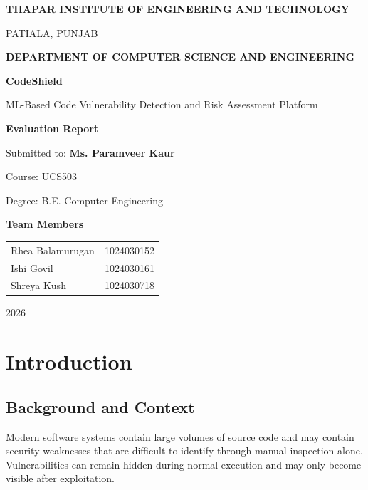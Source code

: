 \documentclass[12pt,a4paper]{report}
\begin{document}
\begin{titlepage}
\centering
{\Large \textbf{THAPAR INSTITUTE OF ENGINEERING AND TECHNOLOGY}\par}
\vspace{0.3cm}
{\large PATIALA, PUNJAB\par}
\vspace{0.8cm}
{\large \textbf{DEPARTMENT OF COMPUTER SCIENCE AND ENGINEERING}\par}
\vspace{2cm}
{\Huge \textbf{CodeShield}\par}
\vspace{0.5cm}
{\LARGE ML-Based Code Vulnerability Detection and Risk Assessment Platform\par}
\vspace{1cm}
{\Large \textbf{Evaluation Report}\par}
\vspace{2cm}
{\large Submitted to: \textbf{Ms. Paramveer Kaur}\par}
{\large Course: UCS503\par}
{\large Degree: B.E. Computer Engineering\par}
\vspace{1.5cm}
{\large \textbf{Team Members}\par}
\vspace{0.3cm}
\begin{tabular}{ll}
Rhea Balamurugan & 1024030152\\
Ishi Govil & 1024030161\\
Shreya Kush & 1024030718
\end{tabular}
\vfill
{\large 2026\par}
\end{titlepage}

\tableofcontents
\clearpage
{}

\chapter{Introduction}

\section{Background and Context}
Modern software systems contain large volumes of source code and may contain security weaknesses that are difficult to identify through manual inspection alone. Vulnerabilities can remain hidden during normal execution and may only become visible after exploitation.
\end{document}
